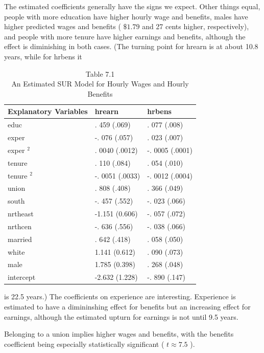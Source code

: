\documentclass[10pt]{article}
\begin{document}
The estimated coefficients generally have the signs we expect. Other things equal, people with more education have higher hourly wage and benefits, males have higher predicted wages and benefits ( $\$ 1.79$ and 27 cents higher, respectively), and people with more tenure have higher earnings and benefits, although the effect is diminishing in both cases. (The turning point for hrearn is at about 10.8 years, while for hrbens it

\begin{table}[h]
\begin{center}
\captionsetup{labelformat=empty}
\caption{Table 7.1\\
An Estimated SUR Model for Hourly Wages and Hourly Benefits}
\begin{tabular}{|l|l|l|}
\hline
Explanatory Variables & hrearn & hrbens \\
\hline
educ & . 459 (.069) & . 077 (.008) \\
\hline
exper & -. 076 (.057) & . 023 (.007) \\
\hline
exper ${ }^{2}$ & . 0040 (.0012) & -. 0005 (.0001) \\
\hline
tenure & . 110 (.084) & . 054 (.010) \\
\hline
tenure ${ }^{2}$ & -. 0051 (.0033) & -. 0012 (.0004) \\
\hline
union & . 808 (.408) & . 366 (.049) \\
\hline
south & -. 457 (.552) & -. 023 (.066) \\
\hline
nrtheast & -1.151 (0.606) & -. 057 (.072) \\
\hline
nrthcen & -. 636 (.556) & -. 038 (.066) \\
\hline
married & . 642 (.418) & . 058 (.050) \\
\hline
white & 1.141 (0.612) & . 090 (.073) \\
\hline
male & 1.785 (0.398) & . 268 (.048) \\
\hline
intercept & -2.632 (1.228) & -. 890 (.147) \\
\hline
\end{tabular}
\end{center}
\end{table}

is 22.5 years.) The coefficients on experience are interesting. Experience is estimated to have a dimininshing effect for benefits but an increasing effect for earnings, although the estimated upturn for earnings is not until 9.5 years.

Belonging to a union implies higher wages and benefits, with the benefits coefficient being especially statistically significant ( $t \approx 7.5$ ).
\end{document}
